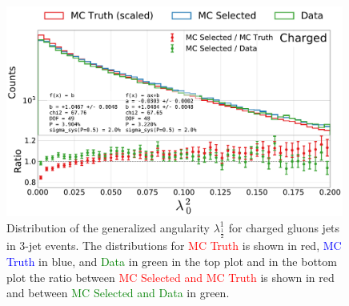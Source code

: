 \begin{figure}[h!]
  \centerfloat
  \includegraphics[width=0.99\textwidth, trim=0 0 0 0, clip, page=2]{figures/quarks/generalized_angularities_cha-down_sample=1.00-ML_vars=vertex-selection=b-ejet_min=4-n_iter_RS_lgb=99-n_iter_RS_xgb=9-cdot_cut=0.90-version=19.pdf}
  \caption[Generalized Angularities for Charged Gluons Jets: $\lambda_{\frac{1}{2}}^1$]
          {Distribution of the generalized angularity $\lambda_{\frac{1}{2}}^1$ for charged gluons jets in 3-jet events. The distributions for \textcolor{red}{MC Truth} is shown in red, \textcolor{blue}{MC Truth} in blue, and \textcolor{green}{Data} in green in the top plot and in the bottom plot the ratio between \textcolor{red}{MC Selected and MC Truth} is shown in red and between \textcolor{green}{MC Selected and Data} in green. }
  \label{fig:q:generalized_angularities_cha_lambda_5_1}
\end{figure}
